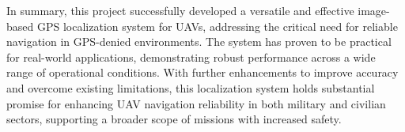 In summary, this project successfully developed a versatile and effective image-based GPS localization system for UAVs, addressing the critical need for reliable navigation in GPS-denied environments. The system has proven to be practical for real-world applications, demonstrating robust performance across a wide range of operational conditions. With further enhancements to improve accuracy and overcome existing limitations, this localization system holds substantial promise for enhancing UAV navigation reliability in both military and civilian sectors, supporting a broader scope of missions with increased safety. 